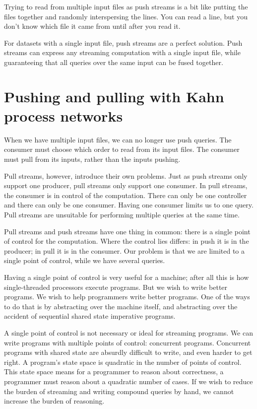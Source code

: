 Trying to read from multiple input files as push streams is a bit like putting the files together and randomly interspersing the lines.
You can read a line, but you don't know which file it came from until after you read it.

For datasets with a single input file, push streams are a perfect solution.
Push streams can express any streaming computation with a single input file, while guaranteeing that all queries over the same input can be fused together.

\section{Pushing and pulling with Kahn process networks}

When we have multiple input files, we can no longer use push queries.
The consumer must choose which order to read from its input files.
The consumer must pull from its inputs, rather than the inputs pushing.

Pull streams, however, introduce their own problems.
Just as push streams only support one producer, pull streams only support one consumer.
In pull streams, the consumer is in control of the computation.
There can only be one controller and there can only be one consumer.
Having one consumer limits us to one query.
Pull streams are unsuitable for performing multiple queries at the same time.


Pull streams and push streams have one thing in common: there is a single point of control for the computation.
Where the control lies differs: in push it is in the producer; in pull it is in the consumer.
Our problem is that we are limited to a single point of control, while we have several queries.

Having a single point of control is very useful for a machine; after all this is how single-threaded processors execute programs.
But we wish to write better programs.
We wish to help programmers write better programs.
One of the ways to do that is by abstracting over the machine itself, and abstracting over the accident of sequential shared state imperative programs.

A single point of control is not necessary or ideal for streaming programs.
We can write programs with multiple points of control: concurrent programs.
Concurrent programs with shared state are absurdly difficult to write, and even harder to get right.
A program's state space is quadratic in the number of points of control.
This state space means for a programmer to reason about correctness, a programmer must reason about a quadratic number of cases.
If we wish to reduce the burden of streaming and writing compound queries by hand, we cannot increase the burden of reasoning.

